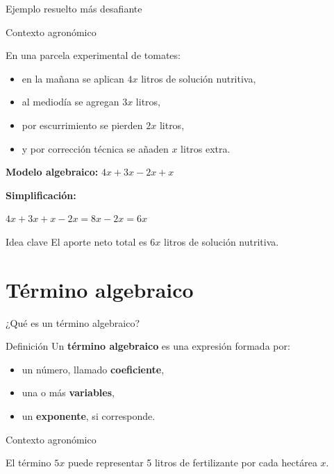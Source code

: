 \documentclass[handout,aspectratio=169,12pt]{beamer}
\newcommand{\IdeaClave}[1]{
	\begin{alertblock}{Idea clave}
		#1
	\end{alertblock}
}
\newcommand{\Agronomia}[1]{
	\begin{exampleblock}{Contexto agronómico}
		#1
	\end{exampleblock}
}
\begin{document}
	\begin{frame}{Ejemplo resuelto más desafiante}
		\Agronomia{
			En una parcela experimental de tomates:
			\begin{itemize}
				\item en la mañana se aplican \(4x\) litros de solución nutritiva,
				\pause
				\item al mediodía se agregan \(3x\) litros,
				\pause
				\item por escurrimiento se pierden \(2x\) litros,
				\pause
				\item y por corrección técnica se añaden \(x\) litros extra.
			\end{itemize}
		}
		
		\pause
		\textbf{Modelo algebraico: } $4x+3x-2x+x$
		
		\medskip
		
		\pause
		
		\textbf{Simplificación:}
	
	\medskip 
	
	\qquad $4x+3x+x-2x=8x-2x=6x$
		
		\pause
		\IdeaClave{El aporte neto total es \(6x\) litros de solución nutritiva.}
	\end{frame}
	
	\section{Término algebraico}
	\begin{frame}{¿Qué es un término algebraico?}
		\begin{block}{Definición}
			Un \textbf{término algebraico} es una expresión formada por:
			\begin{itemize}
				\item un número, llamado \textbf{coeficiente},
				\pause
				\item una o más \textbf{variables},
				\pause
				\item un \textbf{exponente}, si corresponde.
			\end{itemize}
		\end{block}
		
		\pause
		\Agronomia{
			El término \(5x\) puede representar 5 litros de fertilizante por cada hectárea \(x\).
		}
	\end{frame}
	
\end{document}
